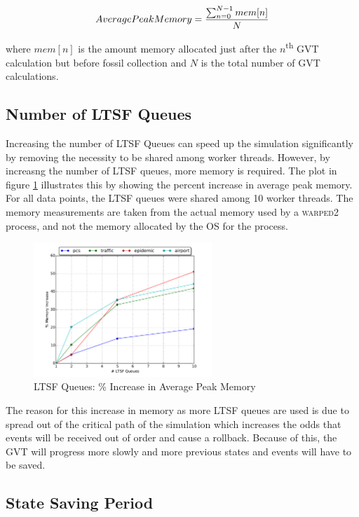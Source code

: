 \documentclass[11pt]{book}
\begin{document}
$$ Average Peak Memory = {\sum_{n=0}^{N-1} {mem[n]} \over N} $$

\noindent
where $mem[n]$ is the amount memory allocated just after the $n$\textsuperscript{th} GVT calculation
but before fossil collection and $N$ is the total number of GVT calculations.

\subsection{Number of LTSF Queues}

Increasing the number of LTSF Queues can speed up the simulation significantly by removing
the necessity to be shared among worker threads.  However, by increasng the number of LTSF queues,
more memory is required.  The plot in figure \ref{ltsf_memory} illustrates this by showing the
percent increase in average peak memory.  For all data points, the LTSF queues were shared among
10 worker threads.  The memory measurements are taken from the actual memory used by a
\textsc{warped2} process, and not the memory allocated by the OS for the process.

\begin{figure}
  \centering
  \includegraphics[width=0.6\textwidth,keepaspectratio,quiet]{figs/pending_event_set/ltsf_memory_increase.pdf}
  \caption{LTSF Queues: \% Increase in Average Peak Memory}\label{ltsf_memory}
\end{figure}

The reason for this increase in memory as more LTSF queues are used is due to spread out of the
critical path of the simulation which increases the odds that events will be received out of
order and cause a rollback.  Because of this, the GVT will progress more slowly and more previous
states and events will have to be saved.  

\subsection{State Saving Period}
\end{document}
